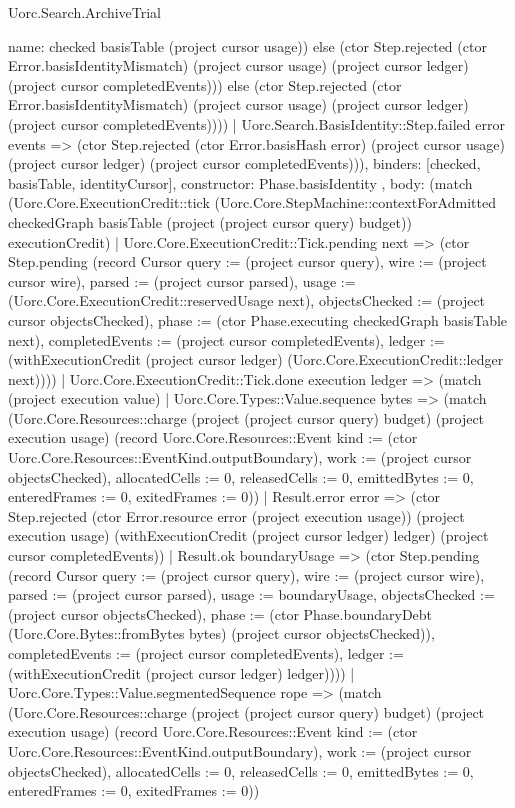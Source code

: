 \begin{lexlean}{Uorc.Search.ArchiveTrial}
\begin{semanticmodule}
{{{{              name: checked
            } basisTable (project cursor usage)) else (ctor Step.rejected (ctor Error.basisIdentityMismatch) (project cursor usage) (project cursor ledger) (project cursor completedEvents))) else (ctor Step.rejected (ctor Error.basisIdentityMismatch) (project cursor usage) (project cursor ledger) (project cursor completedEvents))))
          | Uorc.Search.BasisIdentity::Step.failed error events => (ctor Step.rejected (ctor Error.basisHash error) (project cursor usage) (project cursor ledger) (project cursor completedEvents))),
        binders: [checked, basisTable, identityCursor],
        constructor: Phase.basisIdentity
      },
      {
        body: (match (Uorc.Core.ExecutionCredit::tick (Uorc.Core.StepMachine::contextForAdmitted checkedGraph basisTable (project (project cursor query) budget)) executionCredit)
          | Uorc.Core.ExecutionCredit::Tick.pending next => (ctor Step.pending (record Cursor {query := (project cursor query), wire := (project cursor wire), parsed := (project cursor parsed), usage := (Uorc.Core.ExecutionCredit::reservedUsage next), objectsChecked := (project cursor objectsChecked), phase := (ctor Phase.executing checkedGraph basisTable next), completedEvents := (project cursor completedEvents), ledger := (withExecutionCredit (project cursor ledger) (Uorc.Core.ExecutionCredit::ledger next))}))
          | Uorc.Core.ExecutionCredit::Tick.done execution ledger => (match (project execution value)
            | Uorc.Core.Types::Value.sequence bytes => (match (Uorc.Core.Resources::charge (project (project cursor query) budget) (project execution usage) (record Uorc.Core.Resources::Event {kind := (ctor Uorc.Core.Resources::EventKind.outputBoundary), work := (project cursor objectsChecked), allocatedCells := 0, releasedCells := 0, emittedBytes := 0, enteredFrames := 0, exitedFrames := 0}))
              | Result.error error => (ctor Step.rejected (ctor Error.resource error (project execution usage)) (project execution usage) (withExecutionCredit (project cursor ledger) ledger) (project cursor completedEvents))
              | Result.ok boundaryUsage => (ctor Step.pending (record Cursor {query := (project cursor query), wire := (project cursor wire), parsed := (project cursor parsed), usage := boundaryUsage, objectsChecked := (project cursor objectsChecked), phase := (ctor Phase.boundaryDebt (Uorc.Core.Bytes::fromBytes bytes) (project cursor objectsChecked)), completedEvents := (project cursor completedEvents), ledger := (withExecutionCredit (project cursor ledger) ledger)})))
            | Uorc.Core.Types::Value.segmentedSequence rope => (match (Uorc.Core.Resources::charge (project (project cursor query) budget) (project execution usage) (record Uorc.Core.Resources::Event {kind := (ctor Uorc.Core.Resources::EventKind.outputBoundary), work := (project cursor objectsChecked), allocatedCells := 0, releasedCells := 0, emittedBytes := 0, enteredFrames := 0, exitedFrames := 0}))
}}}
\end{semanticmodule}
\end{lexlean}
